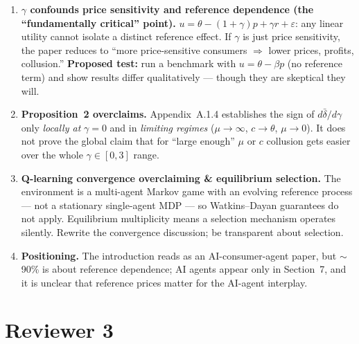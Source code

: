 \documentclass[11pt]{article}
\newcommand{\crit}[1]{\textcolor{crit}{\textbf{#1}}}
\begin{document}
\begin{enumerate}[label=\textbf{R2.\arabic*.}]
  \item \crit{$\gamma$ confounds price sensitivity and reference dependence (the ``fundamentally
        critical'' point).} $u = \theta - (1+\gamma)p + \gamma r + \varepsilon$: any linear utility
        cannot isolate a distinct reference effect. If $\gamma$ is just price sensitivity, the paper
        reduces to ``more price-sensitive consumers $\Rightarrow$ lower prices, profits, collusion.''
        \textbf{Proposed test:} run a benchmark with $u = \theta - \beta p$ (no reference term) and show
        results differ qualitatively --- though they are skeptical they will.
  \item \textbf{Proposition~2 overclaims.} Appendix~A.1.4 establishes the sign of
        $d\bar\delta/d\gamma$ only \emph{locally at} $\gamma=0$ and in \emph{limiting regimes}
        ($\mu\!\to\!\infty$, $c\!\to\!\theta$, $\mu\!\to\!0$). It does not prove the global claim that
        for ``large enough'' $\mu$ or $c$ collusion gets easier over the whole $\gamma\in[0,3]$ range.
  \item \textbf{Q-learning convergence overclaiming \& equilibrium selection.} The environment is a
        multi-agent Markov game with an evolving reference process --- not a stationary single-agent MDP
        --- so Watkins--Dayan guarantees do not apply. Equilibrium multiplicity means a selection
        mechanism operates silently. Rewrite the convergence discussion; be transparent about selection.
  \item \textbf{Positioning.} The introduction reads as an AI-consumer-agent paper, but $\sim$90\% is
        about reference dependence; AI agents appear only in Section~7, and it is unclear that reference
        prices matter for the AI-agent interplay.
\end{enumerate}

\section{Reviewer 3}
\end{document}
